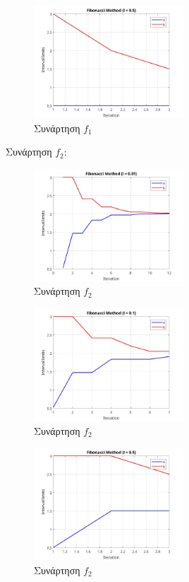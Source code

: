 \begin{figure}[H] %
    \centering
    \includegraphics[width=0.5\textwidth]{media/fibonaccif1_05} %
    \caption{Συνάρτηση $f_1$}
\end{figure}

Συνάρτηση $f_2$:
\begin{figure}[H] %
    \centering
    \includegraphics[width=0.5\textwidth]{media/fibonaccif2_001} %
    \caption{Συνάρτηση $f_2$}
\end{figure}
\begin{figure}[H] %
    \centering
    \includegraphics[width=0.5\textwidth]{media/fibonaccif2_01} %
    \caption{Συνάρτηση $f_2$}
\end{figure}
\begin{figure}[H] %
    \centering
    \includegraphics[width=0.5\textwidth]{media/fibonaccif2_05} %
    \caption{Συνάρτηση $f_2$}
\end{figure}


